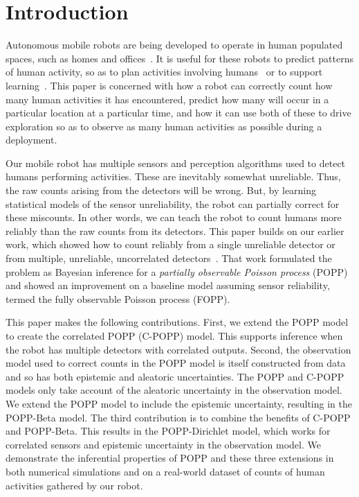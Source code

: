 

\section{Introduction}
\label{sec:introduction}

Autonomous mobile robots are being developed to operate in human populated spaces, such as homes and offices~\cite{hawes2016strands}. It is useful for these robots to predict patterns of human activity, so as to plan activities involving humans~\cite{2020AAMAS_street} or to support learning~\cite{coppola2016learning, duckworth2016}. This paper is concerned with how a robot can correctly count how many human activities it has encountered, predict how many will occur in a particular location at a particular time, and how it can use both of these to drive exploration so as to observe as many human activities as possible during a deployment.

Our mobile robot has multiple sensors and perception algorithms used to detect humans performing activities. These are inevitably somewhat unreliable. Thus, the raw counts arising from the detectors will be wrong. But, by learning statistical models of the sensor unreliability, the robot can partially correct for these miscounts. In other words, we can teach the robot to count humans more reliably than the raw counts from its detectors. This paper builds on our earlier work, which showed how to count reliably from a single unreliable detector or from multiple, unreliable, uncorrelated detectors~\cite{jovan18a}. That work formulated the problem as Bayesian inference for a \textit{partially observable Poisson process} (POPP) and showed an improvement on a baseline model assuming sensor reliability, termed the fully observable Poisson process (FOPP).

This paper makes the following contributions. First, we extend the POPP model to create the correlated POPP (C-POPP) model. This supports inference when the robot has multiple detectors with correlated outputs. Second, the observation model used to correct counts in the POPP model is itself constructed from data and so has both epistemic and aleatoric uncertainties. The POPP and C-POPP models only take account of the aleatoric uncertainty in the observation model. We extend the POPP model to include the epistemic uncertainty, resulting in the POPP-Beta model. The third contribution is to combine the benefits of C-POPP and POPP-Beta. This results in the POPP-Dirichlet model, which works for correlated sensors and epistemic uncertainty in the observation model. We demonstrate the inferential properties of POPP and these three extensions in both numerical simulations and on a real-world dataset of counts of human activities gathered by our robot.

